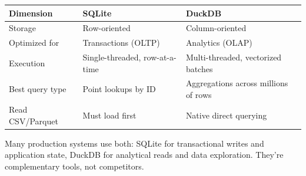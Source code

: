 \documentclass[
  letterpaper,
  DIV=11,
  numbers=noendperiod]{scrreprt}
\begin{document}
\begin{longtable}[]{@{}
  >{\raggedright\arraybackslash}p{}
  >{\raggedright\arraybackslash}p{}
  >{\raggedright\arraybackslash}p{}@{}}
\toprule\noalign{}
\begin{minipage}[b]{\linewidth}\raggedright
Dimension
\end{minipage} & \begin{minipage}[b]{\linewidth}\raggedright
SQLite
\end{minipage} & \begin{minipage}[b]{\linewidth}\raggedright
DuckDB
\end{minipage} \\
\midrule\noalign{}
\endhead
\bottomrule\noalign{}
\endlastfoot
Storage & Row-oriented & Column-oriented \\
Optimized for & Transactions (OLTP) & Analytics (OLAP) \\
Execution & Single-threaded, row-at-a-time & Multi-threaded, vectorized
batches \\
Best query type & Point lookups by ID & Aggregations across millions of
rows \\
Read CSV/Parquet & Must load first & Native direct querying \\
\end{longtable}

Many production systems use both: SQLite for transactional writes and
application state, DuckDB for analytical reads and data exploration.
They're complementary tools, not competitors.
\end{document}
